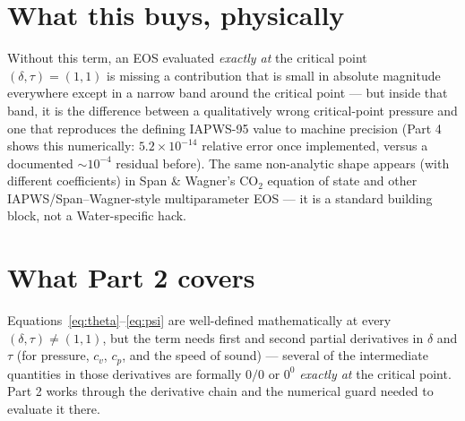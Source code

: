 \documentclass[11pt]{article}
\begin{document}
\section{What this buys, physically}

Without this term, an EOS evaluated \emph{exactly at} the critical point
$(\delta,\tau)=(1,1)$ is missing a contribution that is small in absolute
magnitude everywhere except in a narrow band around the critical point —
but inside that band, it is the difference between a qualitatively wrong
critical-point pressure and one that reproduces the defining IAPWS-95 value
to machine precision (Part 4 shows this numerically: $5.2\times10^{-14}$
relative error once implemented, versus a documented $\sim 10^{-4}$ residual
before). The same non-analytic shape appears (with different coefficients)
in Span \& Wagner's CO$_2$ equation of state \cite{span1996wagner} and other
IAPWS/Span--Wagner-style multiparameter EOS — it is a standard building
block, not a Water-specific hack.

\section{What Part 2 covers}

Equations~\ref{eq:theta}--\ref{eq:psi} are well-defined mathematically at
every $(\delta,\tau) \neq (1,1)$, but the term needs first and second
partial derivatives in $\delta$ and $\tau$ (for pressure, $c_v$, $c_p$, and
the speed of sound) — several of the intermediate quantities in those
derivatives are formally $0/0$ or $0^0$ \emph{exactly at} the critical
point. Part 2 works through the derivative chain and the numerical guard
needed to evaluate it there.

\printbibliography
\end{document}

